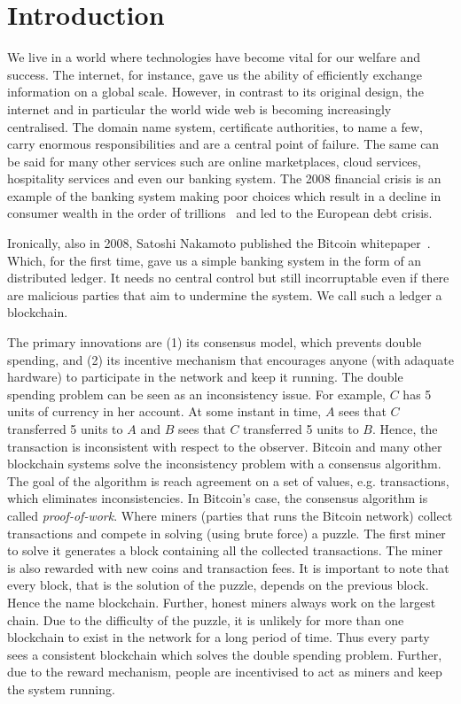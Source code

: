 \chapter{Introduction}
\label{ch:intro}

We live in a world where technologies have become vital for our welfare and success.
The internet, for instance, gave us the ability of efficiently exchange information on a global scale.
However, in contrast to its original design, the internet and in particular the world wide web is becoming increasingly centralised.
The domain name system, certificate authorities, to name a few, carry enormous responsibilities and are a central point of failure.
The  same can be said for many other services such are online marketplaces,
cloud services, hospitality services and even our banking system.
The 2008 financial crisis is an example of the banking system making poor choices which result in a
decline in consumer wealth in the order of trillions~\cite{financialcrisis} and led to the European debt crisis.

Ironically, also in 2008, Satoshi Nakamoto published the Bitcoin whitepaper~\cite{bitcoin}.
Which, for the first time, gave us a simple banking system in the form of an distributed ledger.
It needs no central control but still incorruptable even if there are malicious parties that aim to undermine the system.
We call such a ledger a blockchain.

The primary innovations are (1) its consensus model, which prevents double spending,
and (2) its incentive mechanism that encourages anyone (with adaquate hardware) to participate in the network and keep it running.
The double spending problem can be seen as an inconsistency issue.
For example, $C$ has 5 units of currency in her account.
At some instant in time, $A$ sees that $C$ transferred 5 units to $A$ and $B$ sees that $C$ transferred 5 units to $B$.
Hence, the transaction is inconsistent with respect to the observer.
Bitcoin and many other blockchain systems solve the inconsistency problem with a consensus algorithm.
The goal of the algorithm is reach agreement on a set of values, e.g. transactions, which eliminates inconsistencies.
In Bitcoin's case, the consensus algorithm is called \emph{proof-of-work}.
Where miners (parties that runs the Bitcoin network) collect transactions and compete in solving (using brute force) a puzzle.
The first miner to solve it generates a block containing all the collected transactions.
The miner is also rewarded with new coins and transaction fees.
It is important to note that every block, that is the solution of the puzzle,
depends on the previous block.
Hence the name blockchain.
Further, honest miners always work on the largest chain.
Due to the difficulty of the puzzle,
it is unlikely for more than one blockchain to exist in the network for a long period of time.
Thus every party sees a consistent blockchain which solves the double spending problem.
Further, due to the reward mechanism,
people are incentivised to act as miners and keep the system running.

